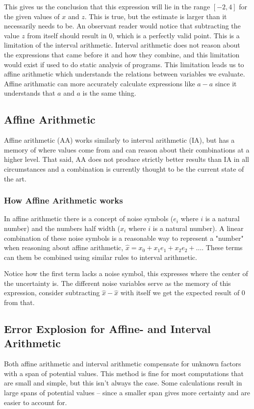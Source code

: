 \documentclass[msc,lith,english]{liuthesis}
\begin{document}
This gives us the conclusion that this expression will lie in the range $[-2, 4]$ for the given values of $x$ and $z$. This is true, but the estimate is larger than it necessarily needs to be. An observant reader would notice that subtracting the value $z$ from itself should result in $0$, which is a perfectly valid point. This is a limitation of the interval arithmetic. Interval arithmetic does not reason about the expressions that came before it and how they combine, and this limitation would exist if used to do static analysis of programs. This limitation leads us to affine arithmetic which understands the relations between variables we evaluate. Affine arithmatic can more accurately calculate expressions like $a - a$ since it understands that $a$ and $a$ is the same thing.


\subsection{Affine Arithmetic}
Affine arithmetic (AA) works similarly to interval arithmetic (IA), but has a memory of where values come from and can reason about their combinations at a higher level. That said, AA does not produce strictly better results than IA in all circumstances and a combination is currently thought to be the current state of the art. 

\subsubsection{How Affine Arithmetic works}
In affine arithmetic there is a concept of noise symbols ($e_i$ where $i$ is a natural number) and the numbers half width ($x_i$ where $i$ is a natural number). A linear combination of these noise symbols is a reasonable way to represent a "number" when reasoning about affine arithmetic, $\hat{x} = x_0 + x_1e_1 + x_2e_2 + \dots$. These terms can them be combined using similar rules to interval arithmetic.

Notice how the first term lacks a noise symbol, this expresses where the center of the uncertainty is. The different noise variables serve as the memory of this expression, consider subtracting $\hat{x} - \hat{x}$ with itself we get the expected result of 0 from that.


\subsection{Error Explosion for Affine- and Interval Arithmetic}
Both affine arithmetic and interval arithmetic compensate for unknown factors with a span of potential values. This method is fine for most computations that are small and simple, but this isn't always the case. Some calculations result in large spans of potential values -- since a smaller span gives more certainty and are easier to account for.
\end{document}
